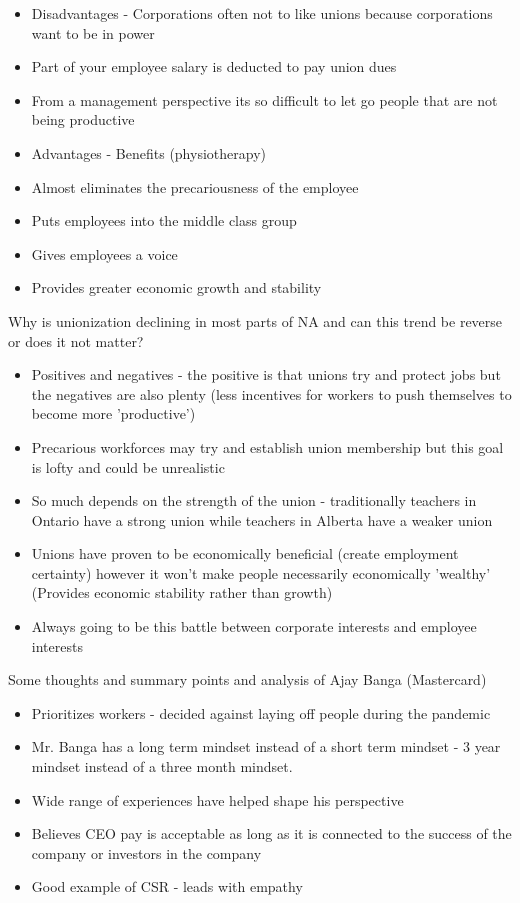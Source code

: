 \documentclass[11pt]{article}
\begin{document}
\begin{itemize}
    \item Disadvantages - Corporations often not to like unions because corporations want to be in power
    \item Part of your employee salary is deducted to pay union dues
    \item From a management perspective its so difficult to let go people that are not being productive
    \item Advantages - Benefits (physiotherapy)
    \item Almost eliminates the precariousness of the employee
    \item Puts employees into the middle class group
    \item Gives employees a voice
    \item Provides greater economic growth and stability
\end{itemize}

Why is unionization declining in most parts of NA and can this trend be reverse or does it not matter?

\begin{itemize}
    \item Positives and negatives - the positive is that unions try and protect jobs but the negatives are also plenty (less incentives for workers to push themselves to become more 'productive')
    \item Precarious workforces may try and establish union membership but this goal is lofty and could be unrealistic
    \item So much depends on the strength of the union - traditionally teachers in Ontario have a strong union while teachers in Alberta have a weaker union
    \item Unions have proven to be economically beneficial (create employment certainty) however it won't make people necessarily economically 'wealthy' (Provides economic stability rather than growth)
    \item Always going to be this battle between corporate interests and employee interests
\end{itemize}

Some thoughts and summary points and analysis of Ajay Banga (Mastercard)

\begin{itemize}
    \item Prioritizes workers - decided against laying off people during the pandemic
    \item Mr. Banga has a long term mindset instead of a short term mindset - 3 year mindset instead of a three month mindset.
    \item Wide range of experiences have helped shape his perspective 
    \item Believes CEO pay is acceptable as long as it is connected to the success of the company or investors in the company
    \item Good example of CSR - leads with empathy
\end{itemize}
\end{document}
